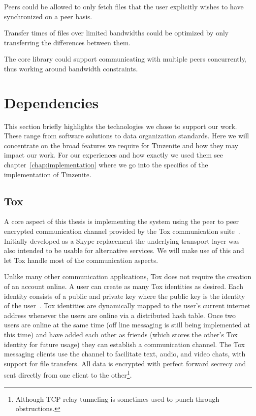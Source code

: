 \begin{description}[leftmargin=7.5em,style=nextline,noitemsep,nolistsep]
\item[Shadow Files]
    Peers could be allowed to only fetch files that the user explicitly wishes to have synchronized on a peer basis.
\item[Delta Updates]
    Transfer times of files over limited bandwidths could be optimized by only transferring the differences between them.
\item[Concurrency]
    The core library could support communicating with multiple peers concurrently, thus working around bandwidth constraints.
\end{description}

\section{Dependencies}
\label{sec:Dependencies}

This section briefly highlights the technologies we chose to support our work.
These range from software solutions to data organization standards.
Here we will concentrate on the broad features we require for Tinzenite and how they may impact our work.
For our experiences and how exactly we used them see chapter~\ref{chap:implementation} where we go into the specifics of the implementation of Tinzenite.

\subsection{Tox}

A core aspect of this thesis is implementing the system using the peer to peer encrypted communication channel provided by the Tox communication suite~\cite{web:site:tox}.
Initially developed as a Skype replacement the underlying transport layer was also intended to be usable for alternative services.
We will make use of this and let Tox handle most of the communication aspects.

Unlike many other communication applications, Tox does not require the creation of an account online.
A user can create as many Tox identities as desired.
Each identity consists of a public and private key where the public key is the identity of the user~\cite{web:site:tox:crypto}.
Tox identities are dynamically mapped to the user's current internet address whenever the users are online via a distributed hash table.
Once two users are online at the same time (off line messaging is still being implemented at this time) and have added each other as friends (which stores the other's Tox identity for future usage) they can establish a communication channel.
The Tox messaging clients use the channel to facilitate text, audio, and video chats, with support for file transfers.
All data is encrypted with perfect forward secrecy and sent directly from one client to the other\footnote{Although TCP relay tunneling is sometimes used to punch through obstructions.}.

